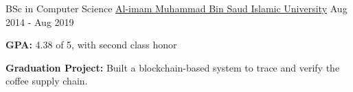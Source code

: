 
\begin{cventries}

  \cventry
    {BSc in Computer Science}
    {\href{https://imamu.edu.sa/}{Al-imam Muhammad Bin Saud Islamic University}}
    {Aug 2014 - Aug 2019}
    {
        \begin{cvitems}
            \vspace{-4.0mm}
            \item {\textbf{GPA:} 4.38 of 5, with second class honor}
            \item {\textbf{Graduation Project:} Built a blockchain-based system to trace and verify the coffee supply chain.}
            \vspace{-4.0mm}
        \end{cvitems}
    }

\end{cventries}
